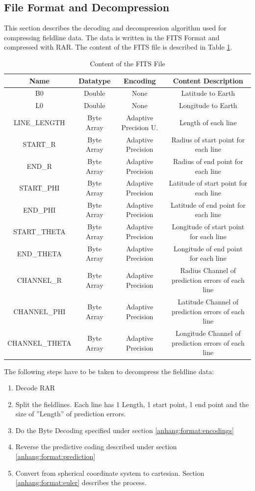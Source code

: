 \subsection{File Format and Decompression}
This section describes the decoding and decompression algorithm used for compressing fieldline data. The data is written in the FITS Format \cite{website:fits} and compressed with RAR. The content of the FITS file is described in Table \ref{anhang:format:content}.\\
\begin{table}[!htbp]
\center
\begin{tabular}{|c|c|c|c|}
	\hline
	Name  & Datatype & Encoding& Content Description	\\\hline
    B0 & Double & None & Latitude to Earth\\
    L0 & Double& None& Longitude to Earth\\
    LINE\_LENGTH &Byte Array & Adaptive Precision U. & Length of each line\\
    START\_R & Byte Array & Adaptive Precision & Radius of start point for each line\\
    END\_R & Byte Array & Adaptive Precision & Radius of end point for each line\\
    START\_PHI & Byte Array & Adaptive Precision & Latitude of start point for each line\\
    END\_PHI & Byte Array & Adaptive Precision & Latitude of end point for each line\\
    START\_THETA & Byte Array & Adaptive Precision & Longitude of start point for each line\\
    END\_THETA & Byte Array & Adaptive Precision & Longitude of end point for each line\\
    CHANNEL\_R & Byte Array & Adaptive Precision & Radius Channel of prediction errors of each line\\
    CHANNEL\_PHI & Byte Array & Adaptive Precision & Latitude Channel of prediction errors of each line\\
    CHANNEL\_THETA & Byte Array & Adaptive Precision & Longitude Channel of prediction errors of each line\\\hline
\end{tabular}
\caption{Content of the FITS File}
\label{anhang:format:content}
\end{table}
The following steps have to be taken to decompress the fieldline data:
\begin{enumerate}
	\item Decode RAR
	\item Split the fieldlines. Each line has 1 Length, 1 start point, 1 end point and the size of ''Length'' of prediction errors.
	\item Do the Byte Decoding specified under section \ref{anhang:format:encodings}
	\item Reverse the predictive coding described under section \ref{anhang:format:prediction}
	\item Convert from spherical coordinate system to cartesian. Section \ref{anhang:format:euler} describes the process.
\end{enumerate}

